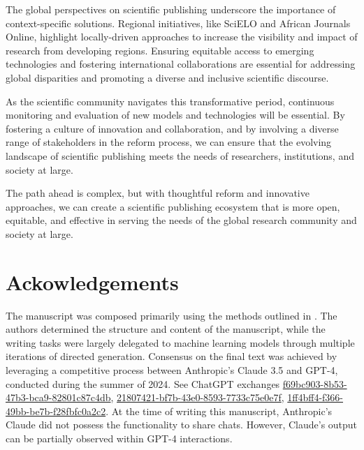 \documentclass{article}
\begin{document}
The global perspectives on scientific publishing underscore the importance of context-specific solutions. Regional initiatives, like SciELO and African Journals Online, highlight locally-driven approaches to increase the visibility and impact of research from developing regions. Ensuring equitable access to emerging technologies and fostering international collaborations are essential for addressing global disparities and promoting a diverse and inclusive scientific discourse.

As the scientific community navigates this transformative period, continuous monitoring and evaluation of new models and technologies will be essential. By fostering a culture of innovation and collaboration, and by involving a diverse range of stakeholders in the reform process, we can ensure that the evolving landscape of scientific publishing meets the needs of researchers, institutions, and society at large.


The path ahead is complex, but with thoughtful reform and innovative approaches, we can create a scientific publishing ecosystem that is more open, equitable, and effective in serving the needs of the global research community and society at large.

\section*{Ackowledgements}
The manuscript was composed primarily using the methods outlined in \cite{llm2024flaws}. The authors determined the structure and content of the manuscript, while the writing tasks were largely delegated to machine learning models through multiple iterations of directed generation. Consensus on the final text was achieved by leveraging a competitive process between Anthropic's Claude 3.5 and GPT-4, conducted during the summer of 2024.  See ChatGPT exchanges \href{https://chatgpt.com/share/f69bc903-8b53-47b3-bca9-82801c87c4db}{f69bc903-8b53-47b3-bca9-82801c87c4db},  \href{https://chatgpt.com/share/21807421-bf7b-43e0-8593-7733c75e0e7f}{21807421-bf7b-43e0-8593-7733c75e0e7f}, \href{https://chatgpt.com/share/1ff4bff4-f366-49bb-be7b-f28fbfc0a2c2}{1ff4bff4-f366-49bb-be7b-f28fbfc0a2c2}. At the time of writing this manuscript, Anthropic's Claude did not possess the functionality to share chats. However, Claude's output can be partially observed within GPT-4 interactions. 




\end{document}
